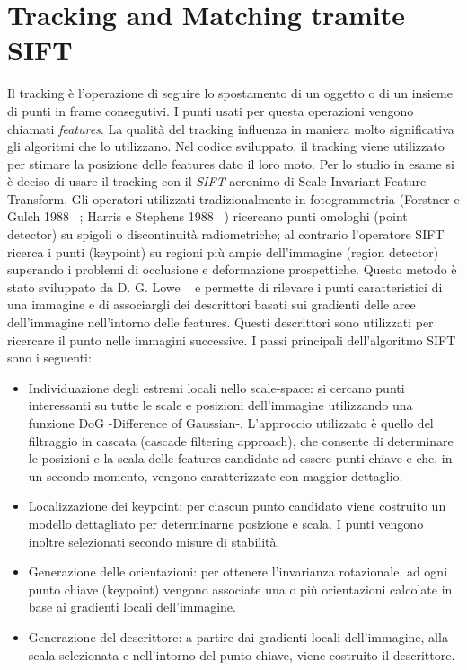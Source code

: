 \chapter{Tracking and Matching tramite SIFT}
\label{chapter3}

Il tracking è l'operazione di seguire lo spostamento di un oggetto o di un insieme di punti in frame consegutivi. I punti usati per questa operazioni vengono chiamati \emph{features}. La qualità del tracking influenza in maniera molto significativa gli algoritmi che lo utilizzano. Nel codice sviluppato, il tracking viene utilizzato per stimare la posizione delle features dato il loro moto. 
Per lo studio in esame si è deciso di usare il tracking con il \emph{SIFT} acronimo di Scale-Invariant Feature Transform. Gli operatori utilizzati tradizionalmente in fotogrammetria (Forstner e Gulch 1988 ~\cite{Forstner}; Harris e Stephens 1988 ~\cite{Harry}) ricercano punti omologhi (point detector) su spigoli o discontinuità radiometriche; al contrario l’operatore SIFT ricerca i punti (keypoint) su regioni più ampie dell’immagine (region detector) superando i problemi di occlusione e deformazione prospettiche.
Questo metodo è stato sviluppato da D. G. Lowe ~\cite{Sift} e permette di rilevare i punti caratteristici di una immagine e di associargli dei descrittori basati sui gradienti delle aree dell'immagine nell'intorno delle features. Questi descrittori sono utilizzati per ricercare il punto nelle immagini successive.
I passi principali dell’algoritmo SIFT sono i seguenti:
\begin{itemize}
  \item Individuazione degli estremi locali nello scale-space: si cercano punti interessanti su tutte le scale e posizioni dell’immagine utilizzando una funzione DoG -Difference of Gaussian-. L’approccio utilizzato è quello del filtraggio in cascata (cascade filtering approach), che consente di determinare le posizioni e la scala delle features candidate ad essere punti chiave e che, in un secondo momento, vengono caratterizzate con maggior dettaglio.
  \item Localizzazione dei keypoint: per ciascun punto candidato viene costruito un modello dettagliato per determinarne posizione e scala. I punti vengono inoltre selezionati secondo misure di stabilità.
  \item Generazione delle orientazioni: per ottenere l’invarianza rotazionale, ad ogni punto chiave (keypoint) vengono associate una o più orientazioni calcolate in base ai gradienti locali dell’immagine.
  \item Generazione del descrittore: a partire dai gradienti locali dell’immagine, alla scala selezionata e nell’intorno del punto chiave, viene costruito il descrittore.
\end{itemize}
